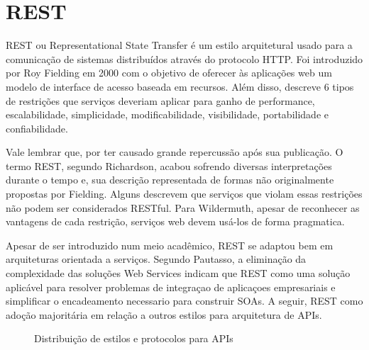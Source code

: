 \section{REST}

REST ou Representational State Transfer é um estilo arquitetural usado para a comunicação de sistemas distribuídos através do protocolo HTTP. Foi introduzido por Roy Fielding em 2000 com o objetivo de oferecer às aplicações web um modelo de interface de acesso baseada em recursos. Além disso, descreve 6 tipos de restrições que serviços deveriam aplicar para ganho de performance, escalabilidade, simplicidade, modificabilidade, visibilidade, portabilidade e confiabilidade.

Vale lembrar que, por ter causado grande repercussão após sua publicação. O termo REST, segundo Richardson, acabou sofrendo diversas interpretações durante o tempo e, sua descrição representada de formas não originalmente propostas por Fielding. Alguns descrevem que serviços que violam essas restrições não podem ser considerados RESTful. Para Wildermuth, apesar de reconhecer as vantagens de cada restrição, serviços web devem usá-los de forma pragmatica. \cite{RichardsonEtAl2013} \cite{Wildermuth2015}

Apesar de ser introduzido num meio acadêmico, REST se adaptou bem em arquiteturas orientada a serviços. Segundo Pautasso, a eliminação da complexidade das soluções Web Services indicam que REST como uma solução aplicável para resolver problemas de integraçao de aplicaçoes empresariais e simplificar o encadeamento necessario para construir SOAs. A seguir, REST como adoção majoritária em relação a outros estilos para arquitetura de APIs. \cite{PautassoEtAl2008}

\begin{figure}[h]
  \centering
  \caption{Distribuição de estilos e protocolos para APIs}
\end{figure}

